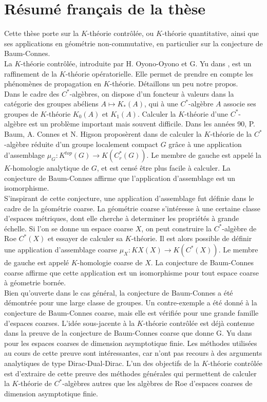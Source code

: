 \section*{Résumé français de la thèse}

Cette thèse porte sur la $K$-théorie contrôlée, ou $K$-théorie quantitative, ainsi que ses applications en géométrie non-commutative, en particulier sur la conjecture de Baum-Connes.\\

La $K$-théorie contrôlée, introduite par H. Oyono-Oyono et G. Yu dans \cite{OY2}, est un raffinement de la $K$-théorie opératorielle. Elle permet de prendre en compte les phénomènes de propagation en $K$-théorie. Détaillons un peu notre propos.\\

Dans le cadre des $C^*$-algèbres, on dispose d'un foncteur à valeurs dans la catégorie des groupes abéliens $A\mapsto K_*(A)$, qui à une $C^*$-algèbre $A$ associe ses groupes de $K$-théorie $K_0(A)$ et $K_1(A)$. Calculer la $K$-théorie d'une $C^*$-algèbre est un problème important mais souvent difficile. Dans les années 90, P. Baum, A. Connes et N. Higson proposèrent dans \cite{BaumConnesHigson} de calculer la $K$-théorie de la $C^*$-algèbre réduite d'un groupe localement compact $G$ grâce à une application d'assemblage $\mu_G : K^{top}(G)\rightarrow K(C_r^*(G))$. Le membre de gauche est appelé la $K$-homologie analytique de $G$, et est censé être plus facile à calculer. La conjecture de Baum-Connes affirme que l'application d'assemblage est un isomorphisme.\\

S'inspirant de cette conjecture, une application d'assemblage fut définie dans le cadre de la géométrie coarse. La géométrie coarse s'intéresse à une certaine classe d'espaces métriques, dont elle cherche à determiner les propriétés à grande échelle. Si l'on se donne un espace coarse $X$, on peut construire la $C^*$-algèbre de Roe $C^*(X)$ et essayer de calculer sa $K$-théorie. Il est alors possible de définir une application d'assemblage coarse $\mu_X : KX(X)\rightarrow K(C^*(X))$. Le membre de gauche est appelé $K$-homologie coarse de $X$. La conjecture de Baum-Connes coarse affirme que cette application est un isomorphisme pour tout espace coarse à géometrie bornée.\\

Bien qu'ouverte dans le cas général, la conjecture de Baum-Connes a été démontrée pour une large classe de groupes. Un contre-exemple a été donné à la conjecture de Baum-Connes coarse, mais elle est vérifiée pour une grande famille d'espaces coarses. L'idée sous-jacente à la $K$-théorie contrôlée est déjà contenue dans la preuve de la conjecture de Baum-Connes coarse que donne G. Yu dans \cite{Yu1} pour les espaces coarses de dimension asymptotique finie. Les méthodes utilisées au cours de cette preuve sont intéressantes, car n'ont pas recours à des arguments analytiques de type Dirac-Dual-Dirac. L'un des objectifs de la $K$-théorie contrôlée est d'extraire de cette preuve des méthodes générales qui permettent de calculer la $K$-théorie de $C^*$-algèbres autres que les algèbres de Roe d'espaces coarses de dimension asymptotique finie.\\

